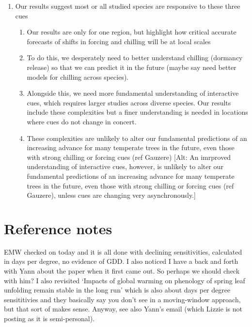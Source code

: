 \documentclass[11pt,letter]{article}
\begin{document}
\begin{enumerate}
\begin{enumerate}
\end{enumerate}
\item Our results suggest most or all studied species are responsive to these three cues
\begin{enumerate}
\item Our results are only for one region, but highlight how critical accurate forecasts of shifts in forcing and chilling will be at local scales
\item To do this, we desperately need to better understand chilling (dormancy release) so that we can predict it in the future (maybe say need better models for chilling across species). 
\item Alongside this, we need more fundamental understanding of interactive cues, which requires larger studies across diverse species. Our results include these complexities but a finer understanding is needed in locations where cues do not change in concert.
\item These complexities are unlikely to alter our fundamental predictions of an increasing advance for many temperate trees in the future, even those with strong chilling or forcing cues (ref Gauzere) [Alt: An imrproved understanding of interactive cues, however, is unlikely to alter our fundamental predictions of an increasing advance for many temperate trees in the future, even those with strong chilling or forcing cues (ref Gauzere), unless cues are changing very asynchronously.]
\end{enumerate}
\end{enumerate}


\section{Reference notes}

EMW checked on \citet{fu2015} today and it is all done with declining sensitivities, calculated in days per degree, no evidence of GDD. I also noticed I have a back and forth with Yann about the paper when it first came out. So perhaps we should check with him? I also revisited `Impacts of global warming on phenology of spring leaf unfolding remain stable in the long run' which is also about days per degree sensititivies and they basically say you don't see in a moving-window approach, but that sort of makes sense. Anyway, see also Yann's email (which Lizzie is not posting as it is semi-personal).
\end{document}
